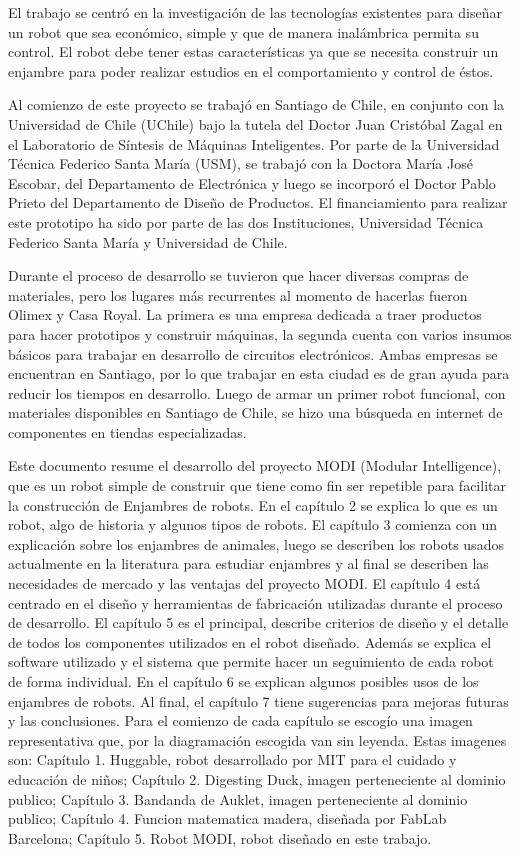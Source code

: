 El trabajo se centró en la investigación de las tecnologías existentes para diseñar un robot que sea económico, simple y que de manera inalámbrica permita su control. El robot debe tener estas características ya que se necesita construir un enjambre para poder realizar estudios en el comportamiento y control de éstos.

Al comienzo de este proyecto se trabajó en Santiago de Chile, en conjunto con la Universidad de Chile (UChile) bajo la tutela del Doctor Juan Cristóbal Zagal en el Laboratorio de Síntesis de Máquinas Inteligentes. Por parte de la Universidad Técnica Federico Santa María (USM), se trabajó con la Doctora María José Escobar, del Departamento de Electrónica y luego se incorporó el Doctor Pablo Prieto del Departamento de Diseño de Productos. El financiamiento para realizar este prototipo ha sido por parte de las dos Instituciones, Universidad Técnica Federico Santa María y Universidad de Chile.

Durante el proceso de desarrollo se tuvieron que hacer diversas compras de materiales, pero los lugares más recurrentes al momento de hacerlas fueron Olimex y Casa Royal. La primera es una empresa dedicada a traer productos para hacer prototipos y construir máquinas, la segunda cuenta con varios insumos básicos para trabajar en desarrollo de circuitos electrónicos. Ambas empresas se encuentran en Santiago, por lo que trabajar en esta ciudad es de gran ayuda para reducir los tiempos en desarrollo.
Luego de armar un primer robot funcional, con materiales disponibles en Santiago de Chile, se hizo una búsqueda en internet de componentes en tiendas especializadas.

Este documento resume el desarrollo del proyecto MODI (Modular Intelligence), que es un robot simple de construir que tiene como fin ser repetible para facilitar la construcción de Enjambres de robots. En el capítulo 2 se explica lo que es un robot, algo de historia y algunos tipos de robots. El capítulo 3 comienza con un explicación sobre los enjambres de animales, luego se describen los robots usados actualmente en la literatura para estudiar enjambres y al final se describen las necesidades de mercado y las ventajas del proyecto MODI. El capítulo 4 está centrado en el diseño y herramientas de fabricación utilizadas durante el proceso de desarrollo. El capítulo 5 es el principal, describe criterios de diseño y el detalle de todos los componentes utilizados en el robot diseñado. Además se explica el software utilizado y el sistema que permite hacer un seguimiento de cada robot de forma individual. En el capítulo 6 se explican algunos posibles usos de los enjambres de robots. Al final, el capítulo 7 tiene sugerencias para mejoras futuras y las conclusiones. Para el comienzo de cada capítulo se escogío una imagen representativa que, por la diagramación escogida van sin leyenda. Estas imagenes son: Capítulo 1. Huggable, robot desarrollado por MIT para el cuidado y educación de niños; Capítulo 2. Digesting Duck, imagen perteneciente al dominio publico; Capítulo 3. Bandanda de Auklet, imagen perteneciente al dominio publico; Capítulo 4. Funcion matematica madera, diseñada por FabLab Barcelona; Capítulo 5. Robot MODI, robot diseñado en este trabajo.


